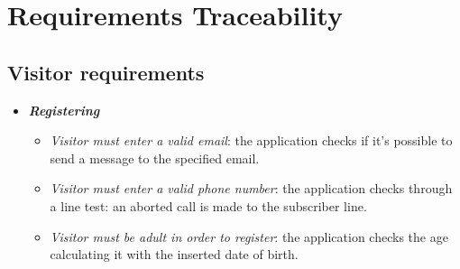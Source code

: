 
\section{Requirements Traceability}

\subsection{Visitor requirements}
\begin{itemize}
\item \textbf{\textit{Registering}}
\begin{itemize}
\item \textit{Visitor must enter a valid email}: the application checks if it's possible to send a message to the specified email.
\item \textit{Visitor must enter a valid phone number}: the application checks through a line test: an aborted call is made to the subscriber line.
\item \textit{Visitor must be adult in order to register}: the application checks the age calculating it with the inserted date of birth.
\end{itemize}
\end{itemize}

